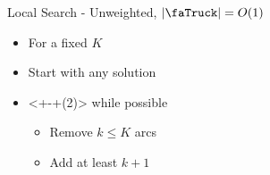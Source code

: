 \begin{frame}{Local Search - Unweighted, $|\text{\faTruck}| = O(1)$}
\begin{itemize}[<+>]
  \item For a fixed $K$
  \item Start with any solution
  \item<+-+(2)> while possible
  	\begin{itemize}
  	  \item Remove $k \leq K$ arcs
  	  \item Add at least $k+1$
	\end{itemize}
\end{itemize}
\end{frame}
